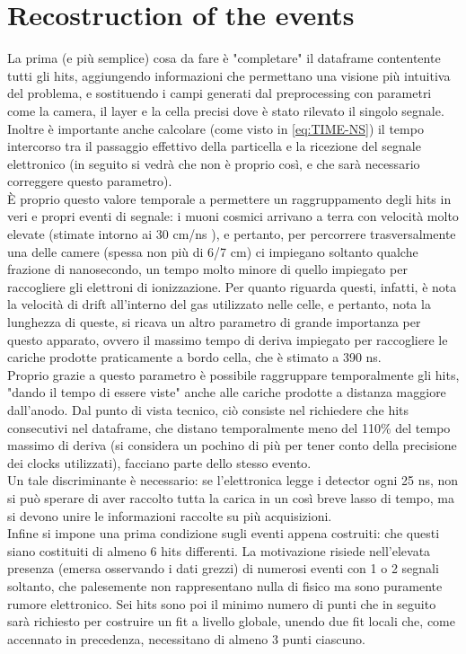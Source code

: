 \documentclass[a4paper,11pt]{book}
\begin{document}
\section{Recostruction of the events}

La prima (e più semplice) cosa da fare è "completare" il dataframe contentente tutti gli hits, aggiungendo informazioni che permettano una visione più intuitiva del problema, e sostituendo i campi generati dal preprocessing con parametri come la camera, il layer e la cella precisi dove è stato rilevato il singolo segnale. Inoltre è importante anche calcolare (come visto in \ref{eq:TIME-NS}) il tempo intercorso tra il passaggio effettivo della particella e la ricezione del segnale elettronico (in seguito si vedrà che non è proprio così, e che sarà necessario correggere questo parametro).\\
È proprio questo valore temporale a permettere un raggruppamento degli hits in veri e propri eventi di segnale: i muoni cosmici arrivano a terra con velocità molto elevate (stimate intorno ai 30 cm/ns %
), e pertanto, per percorrere trasversalmente una delle camere (spessa non più di 6/7 cm) ci impiegano soltanto qualche frazione di nanosecondo, un tempo molto minore di quello impiegato per raccogliere gli elettroni di ionizzazione. Per quanto riguarda questi, infatti, è nota la velocità di drift all'interno del gas utilizzato nelle celle, e pertanto, nota la lunghezza di queste, si ricava un altro parametro di grande importanza per questo apparato, ovvero il massimo tempo di deriva impiegato per raccogliere le cariche prodotte praticamente a bordo cella, che è stimato a 390 ns.\\
Proprio grazie a questo parametro è possibile raggruppare temporalmente gli hits, "dando il tempo di essere viste" anche alle cariche prodotte a distanza maggiore dall'anodo. Dal punto di vista tecnico, ciò consiste nel richiedere che hits consecutivi nel dataframe, che distano temporalmente meno del 110\% del tempo massimo di deriva (si considera un pochino di più per tener conto della precisione dei clocks utilizzati), facciano parte dello stesso evento.\\
Un tale discriminante è necessario: se l'elettronica legge i detector ogni 25 ns, non si può sperare di aver raccolto tutta la carica in un così breve lasso di tempo, ma si devono unire le informazioni raccolte su più acquisizioni.\\

Infine si impone una prima condizione sugli eventi appena costruiti: che questi siano costituiti di almeno 6 hits differenti. La motivazione risiede nell'elevata presenza (emersa osservando i dati grezzi) di numerosi eventi con 1 o 2 segnali soltanto, che palesemente non rappresentano nulla di fisico ma sono puramente rumore elettronico. Sei hits sono poi il minimo numero di punti che in seguito sarà richiesto per costruire un fit a livello globale, unendo due fit locali che, come accennato in precedenza, necessitano di almeno 3 punti ciascuno.\\
\end{document}
